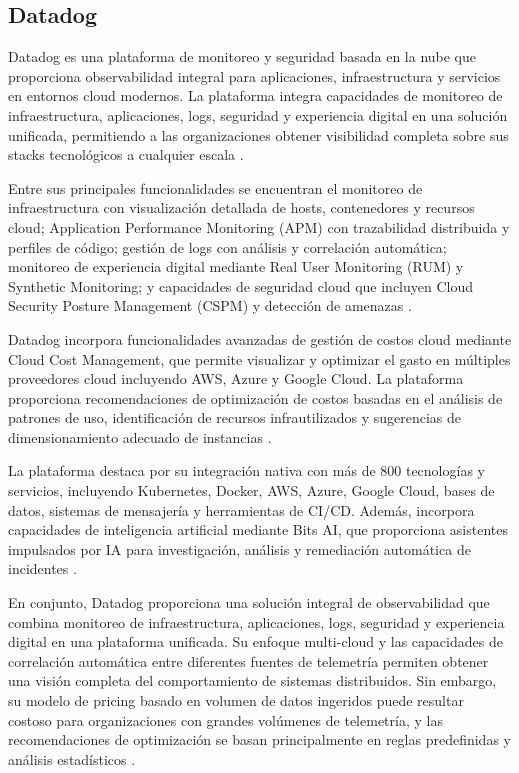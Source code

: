 \subsection{Datadog}

Datadog es una plataforma de monitoreo y seguridad basada en la nube que proporciona observabilidad integral para aplicaciones, infraestructura y servicios en entornos cloud modernos. La plataforma integra capacidades de monitoreo de infraestructura, aplicaciones, logs, seguridad y experiencia digital en una solución unificada, permitiendo a las organizaciones obtener visibilidad completa sobre sus stacks tecnológicos a cualquier escala \parencite{Datadog2026}.

Entre sus principales funcionalidades se encuentran el monitoreo de infraestructura con visualización detallada de hosts, contenedores y recursos cloud; Application Performance Monitoring (APM) con trazabilidad distribuida y perfiles de código; gestión de logs con análisis y correlación automática; monitoreo de experiencia digital mediante Real User Monitoring (RUM) y Synthetic Monitoring; y capacidades de seguridad cloud que incluyen Cloud Security Posture Management (CSPM) y detección de amenazas \parencite{Datadog2026}.

Datadog incorpora funcionalidades avanzadas de gestión de costos cloud mediante Cloud Cost Management, que permite visualizar y optimizar el gasto en múltiples proveedores cloud incluyendo AWS, Azure y Google Cloud. La plataforma proporciona recomendaciones de optimización de costos basadas en el análisis de patrones de uso, identificación de recursos infrautilizados y sugerencias de dimensionamiento adecuado de instancias \parencite{Datadog2026}.

La plataforma destaca por su integración nativa con más de 800 tecnologías y servicios, incluyendo Kubernetes, Docker, AWS, Azure, Google Cloud, bases de datos, sistemas de mensajería y herramientas de CI/CD. Además, incorpora capacidades de inteligencia artificial mediante Bits AI, que proporciona asistentes impulsados por IA para investigación, análisis y remediación automática de incidentes \parencite{Datadog2026}.

En conjunto, Datadog proporciona una solución integral de observabilidad que combina monitoreo de infraestructura, aplicaciones, logs, seguridad y experiencia digital en una plataforma unificada. Su enfoque multi-cloud y las capacidades de correlación automática entre diferentes fuentes de telemetría permiten obtener una visión completa del comportamiento de sistemas distribuidos. Sin embargo, su modelo de pricing basado en volumen de datos ingeridos puede resultar costoso para organizaciones con grandes volúmenes de telemetría, y las recomendaciones de optimización se basan principalmente en reglas predefinidas y análisis estadísticos \parencite{Datadog2026}.


